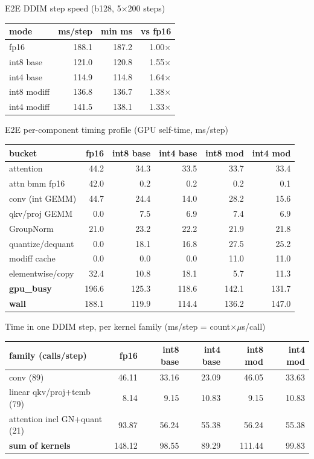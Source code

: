 \documentclass[aspectratio=169,10pt]{beamer}
\newcommand{\g}[1]{{\footnotesize\color{gray}#1}}
\begin{document}
\begin{frame}{E2E DDIM step speed (b128, 5$\times$200 steps)}
\centering\begin{tabular}{@{}lrrr@{}}\toprule
mode & ms/step & min ms & vs fp16\\\midrule
fp16 & 188.1 & 187.2 & 1.00$\times$\\
int8 base & 121.0 & 120.8 & 1.55$\times$\\
int4 base & 114.9 & 114.8 & 1.64$\times$\\
int8 modiff & 136.8 & 136.7 & 1.38$\times$\\
int4 modiff & 141.5 & 138.1 & 1.33$\times$\\
\bottomrule\end{tabular}
\end{frame}
\begin{frame}{E2E per-component timing profile \g{(GPU self-time, ms/step)}}
\centering\scriptsize\begin{tabular}{@{}lrrrrr@{}}\toprule
bucket & fp16 & int8 base & int4 base & int8 mod & int4 mod\\\midrule
attention & 44.2 & 34.3 & 33.5 & 33.7 & 33.4\\
attn bmm fp16 & 42.0 & 0.2 & 0.2 & 0.2 & 0.1\\
conv (int GEMM) & 44.7 & 24.4 & 14.0 & 28.2 & 15.6\\
qkv/proj GEMM & 0.0 & 7.5 & 6.9 & 7.4 & 6.9\\
GroupNorm & 21.0 & 23.2 & 22.2 & 21.9 & 21.8\\
quantize/dequant & 0.0 & 18.1 & 16.8 & 27.5 & 25.2\\
modiff cache & 0.0 & 0.0 & 0.0 & 11.0 & 11.0\\
elementwise/copy & 32.4 & 10.8 & 18.1 & 5.7 & 11.3\\
\midrule
\textbf{gpu\_busy} & 196.6 & 125.3 & 118.6 & 142.1 & 131.7\\
\midrule
\textbf{wall} & 188.1 & 119.9 & 114.4 & 136.2 & 147.0\\
\bottomrule\end{tabular}
\end{frame}
\begin{frame}{Time in one DDIM step, per kernel family \g{(ms/step = count$\times\mu$s/call)}}
\centering\begin{tabular}{@{}lrrrrr@{}}\toprule
family (calls/step) & fp16 & int8 base & int4 base & int8 mod & int4 mod\\\midrule
conv (89) & 46.11 & 33.16 & 23.09 & 46.05 & 33.63\\
linear qkv/proj+temb (79) & 8.14 & 9.15 & 10.83 & 9.15 & 10.83\\
attention incl GN+quant (21) & 93.87 & 56.24 & 55.38 & 56.24 & 55.38\\
\midrule
\textbf{sum of kernels} & 148.12 & 98.55 & 89.29 & 111.44 & 99.83\\
\bottomrule\end{tabular}
\end{frame}
\end{document}
